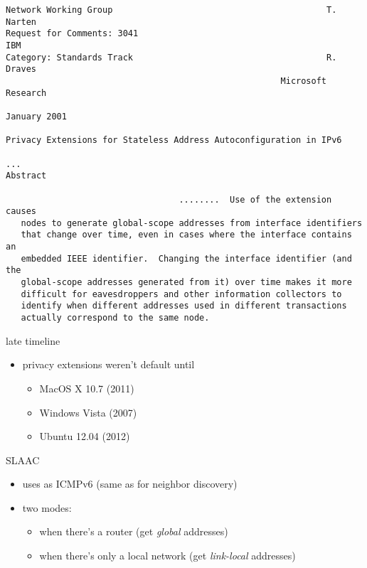 \begin{frame}[fragile]{}
\begin{Verbatim}[fontsize=\fontsize{9}{10}\selectfont]
Network Working Group                                          T. Narten
Request for Comments: 3041                                           IBM
Category: Standards Track                                      R. Draves
                                                      Microsoft Research
                                                                                                                  January 2001
                                                                                                                     Privacy Extensions for Stateless Address Autoconfiguration in IPv6

...
Abstract

                                  ........  Use of the extension causes
   nodes to generate global-scope addresses from interface identifiers
   that change over time, even in cases where the interface contains an
   embedded IEEE identifier.  Changing the interface identifier (and the
   global-scope addresses generated from it) over time makes it more
   difficult for eavesdroppers and other information collectors to
   identify when different addresses used in different transactions
   actually correspond to the same node.
\end{Verbatim}
\end{frame}

\begin{frame}{late timeline}
\begin{itemize}
\item privacy extensions weren't default until
    \begin{itemize}
    \item MacOS X 10.7 (2011)
    \item Windows Vista (2007)
    \item Ubuntu 12.04 (2012)
    \end{itemize}
\end{itemize}
\end{frame}

\begin{frame}{SLAAC}
\begin{itemize}
\item uses as ICMPv6 (same as for neighbor discovery)
\item two modes:
    \begin{itemize}
    \item when there's a router (get \textit{global} addresses)
    \item when there's only a local network (get \textit{link-local} addresses)
    \end{itemize}
\end{itemize}
\end{frame}

